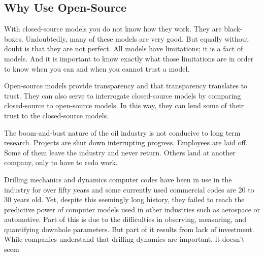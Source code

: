 \subsection{Why Use Open-Source}

With closed-source models you do not know how they work.  They are black-boxes.  Undoubtedly, many of these models are very good.  But equally without doubt is that they are not perfect.  All models have limitations; it is a fact of models.  And it is important to know exactly what those limitations are in order to know when you can and when you cannot trust a model.

Open-source models provide transparency and that transparency translates to trust.  They can also serve to interrogate closed-source models by comparing closed-source to open-source models.  In this way, they can lend some of their trust to the closed-source models.



The boom-and-bust nature of the oil industry is not conducive to long term research.  Projects are shut down interrupting progress.  Employees are laid off.  Some of them leave the industry and never return.  Others land at another company, only to have to redo work. 


Drilling mechanics and dynamics computer codes have been in use in the industry for over fifty years and some currently used commercial codes are 20 to 30 years old.  Yet, despite this seemingly long history, they failed to reach the predictive power of computer models used in other industries such as aerospace or automotive.  Part of this is due to the difficulties in observing, measuring, and quantifying downhole parameters.  But part of it results from lack of investment.  While companies understand that drilling dynamics are important, it doesn't seem